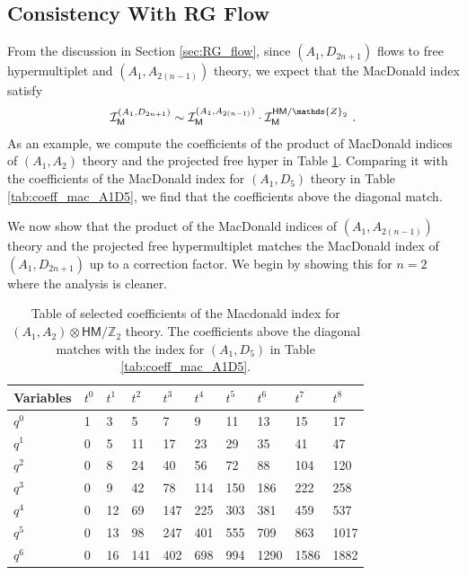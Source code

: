 \documentclass[a4paper,10pt]{article}
\newcommand{\Z}{\mathds{Z}}
\newcommand{\mr}[1]{\mathsf{#1}}
\newcommand{\tsf}[1]{\textsf{#1}}
\def\CI {{\cal I}}
\def\CI {{{\cal I}}}
\begin{document}
\subsection{Consistency With \tsf{RG} Flow}\label{sec:prod_A2n_fH_Mac}
From the discussion in Section \ref{sec:RG_flow}, since $(A_{1},D_{2n+1})$ flows to free hypermultiplet and $(A_1,A_{2(n-1)})$ theory, we expect that the MacDonald index satisfy
\begin{equation}
    \CI^{(A_1,D_{2n+1})}_{\mr{M}}\sim \CI^{(A_1,A_{2(n-1)})}_{\mr{M}}\cdot \CI^{\mr{HM}/\Z_2}_{\mr{M}}~.
\end{equation}
As an example, we compute the coefficients of the product of MacDonald indices of $(A_1,A_2)$ theory and the projected free hyper in Table \ref{tab:coeff_mac_A1A2_fH}. Comparing it with the coefficients of the MacDonald index for $(A_1,D_5)$ theory in Table \ref{tab:coeff_mac_A1D5}, we find that the coefficients above the diagonal match. 
\par
We now show that the product of the MacDonald indices of $(A_1,A_{2(n-1)})$ theory and the projected free hypermultiplet matches the MacDonald index of $(A_1,D_{2n+1})$ up to a correction factor. We begin by showing this for $n=2$ where the analysis is cleaner. 
\begin{table}[]
    \centering
    \begin{tabular}{|l|lllllllll|}
\hline Variables & $t^0$ & $t^1$ & $t^2$ & $t^3$ & $t^4$ & $t^5$ & $t^6$ & $t^7$ & $t^8$ \\
\hline
$q^0$ & 1 & 3 & 5 & 7 & 9 & 11 & 13 & 15 & 17 \\
$q^1$ & 0 & 5 & 11 & 17 & 23 & 29 & 35 & 41 & 47 \\
$q^2$ & 0 & 8 & 24 & 40 & 56 & 72 & 88 & 104 & 120 \\
$q^3$ & 0 & 9 & 42 & 78 & 114 & 150 & 186 & 222 & 258 \\
$q^4$ & 0 & 12 & 69 & 147 & 225 & 303 & 381 & 459 & 537 \\
$q^5$ & 0 & 13 & 98 & 247 & 401 & 555 & 709 & 863 & 1017 \\
$q^6$ & 0 & 16 & 141 & 402 & 698 & 994 & 1290 & 1586 & 1882 \\
\hline
\end{tabular}
    \caption{Table of selected coefficients of the Macdonald index for $(A_1,A_2)\otimes\mr{HM}/\mathds{Z}_2$ theory. The coefficients above the diagonal matches with the index for $(A_1,D_5)$ in Table \ref{tab:coeff_mac_A1D5}.}
    \label{tab:coeff_mac_A1A2_fH}
\end{table}
\end{document}
